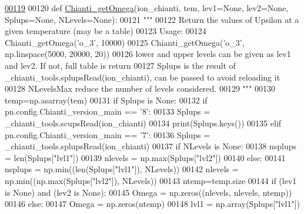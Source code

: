 \begin{DoxyCode}
\hypertarget{namespacepyneb_1_1utils_1_1pn__chianti_l00119}{}\hyperlink{namespacepyneb_1_1utils_1_1pn__chianti_a651b939729d0f5afb817a47a974bfaa1}{00119} 
00120 \textcolor{keyword}{def }\hyperlink{namespacepyneb_1_1utils_1_1pn__chianti_a651b939729d0f5afb817a47a974bfaa1}{Chianti\_getOmega}(ion\_chianti, tem, lev1=None, lev2=None, Splups=None, NLevels=None):
00121     \textcolor{stringliteral}{"""}
00122 \textcolor{stringliteral}{    Return the values of Upsilon at a given temperature (may be a table)}
00123 \textcolor{stringliteral}{    Usage:}
00124 \textcolor{stringliteral}{        Chianti\_getOmega('o\_3', 10000)}
00125 \textcolor{stringliteral}{        Chianti\_getOmega('o\_3', np.linspace(5000, 20000, 20))}
00126 \textcolor{stringliteral}{    lower and upper levels can be given as lev1 and lev2. If not, full table is return}
00127 \textcolor{stringliteral}{    Splups is the result of \_chianti\_tools.splupsRead(ion\_chianti), can be passed to avoid reloading it}
00128 \textcolor{stringliteral}{    NLevelsMax reduce the number of levels considered.}
00129 \textcolor{stringliteral}{    """}
00130     temp=np.asarray(tem)
00131     \textcolor{keywordflow}{if} Splups \textcolor{keywordflow}{is} \textcolor{keywordtype}{None}:
00132         \textcolor{keywordflow}{if} pn.config.Chianti\_version\_main == \textcolor{stringliteral}{'8'}:
00133             Splups = \_chianti\_tools.scupsRead(ion\_chianti)
00134             print(Splups.keys())
00135         \textcolor{keywordflow}{elif} pn.config.Chianti\_version\_main == \textcolor{stringliteral}{'7'}:
00136             Splups = \_chianti\_tools.splupsRead(ion\_chianti)
00137     \textcolor{keywordflow}{if} NLevels \textcolor{keywordflow}{is} \textcolor{keywordtype}{None}:
00138         nsplups = len(Splups[\textcolor{stringliteral}{"lvl1"}])
00139         nlevels = np.max(Splups[\textcolor{stringliteral}{"lvl2"}])
00140     \textcolor{keywordflow}{else}:
00141         nsplups = np.min((len(Splups[\textcolor{stringliteral}{"lvl1"}]), NLevels))
00142         nlevels = np.min((np.max(Splups[\textcolor{stringliteral}{"lvl2"}]), NLevels))
00143     ntemp=temp.size
00144     \textcolor{keywordflow}{if} (lev1 \textcolor{keywordflow}{is} \textcolor{keywordtype}{None}) \textcolor{keywordflow}{and} (lev2 \textcolor{keywordflow}{is} \textcolor{keywordtype}{None}):
00145         Omega = np.zeros((nlevels, nlevels, ntemp))
00146     \textcolor{keywordflow}{else}:
00147         Omega = np.zeros(ntemp)
00148     lvl1 = np.array(Splups[\textcolor{stringliteral}{"lvl1"}])

\end{DoxyCode}
